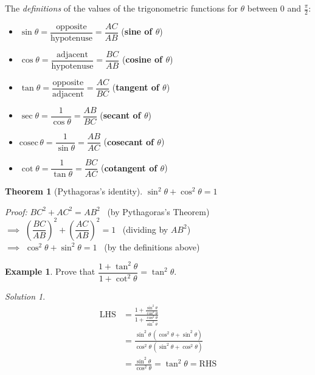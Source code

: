 \documentclass[
  12pt,
  oneside]{book}
\providecommand{\tightlist}{%
  \setlength{\itemsep}{0pt}\setlength{\parskip}{0pt}}
\newtheorem{theorem}{Theorem}[chapter]
\theoremstyle{definition}
\theoremstyle{definition}
\newtheorem{example}{Example}[chapter]
\theoremstyle{definition}
\theoremstyle{definition}
\theoremstyle{remark}
\newtheorem*{solution}{Solution}
\begin{document}
The \emph{definitions} of the values of the trigonometric functions for \(\theta\) between \(0\) and \(\frac{\pi}{2}\):

\begin{itemize}
\tightlist
\item
  \(\sin\theta = \dfrac{\text{opposite}}{\text{hypotenuse}} = \dfrac{AC}{AB}\) (\textbf{sine of \(\theta\)})
\item
  \(\cos\theta = \dfrac{\text{adjacent}}{\text{hypotenuse}} = \dfrac{BC}{AB}\) (\textbf{cosine of \(\theta\)})
\item
  \(\tan\theta = \dfrac{\text{opposite}}{\text{adjacent}} = \dfrac{AC}{BC}\) (\textbf{tangent of \(\theta\)})
\item
  \(\sec\theta = \dfrac{1}{\cos\theta} = \dfrac{AB}{BC}\) (\textbf{secant of \(\theta\)})
\item
  \(\mathrm{cosec}\,\theta = \dfrac{1}{\sin\theta} = \dfrac{AB}{AC}\) (\textbf{cosecant of \(\theta\)})
\item
  \(\cot\theta = \dfrac{1}{\tan\theta} = \dfrac{BC}{AC}\) (\textbf{cotangent of \(\theta\)})
\end{itemize}

\begin{theorem}[Pythagoras's identity]
\(\sin^2\theta+\cos^2\theta=1\)
\end{theorem}

\emph{Proof:} \(BC^2+AC^2=AB^2\) \hfill~{(by Pythagoras's Theorem)}\\
\(\implies\) \(\left(\dfrac{BC}{AB}\right)^2+\left(\dfrac{AC}{AB}\right)^2=1\) \hfill~{(dividing by \(AB^2\))}\\
\(\implies\) \(\cos^2\theta+\sin^2\theta = 1\) \hfill~{(by the definitions above)}

\begin{example}
Prove that \(\dfrac{1+\tan^2\theta}{1+\cot^2\theta} = \tan^2\theta\).
\end{example}

\begin{solution}
\begin{align*}
\mathrm{LHS} &= \frac{1+\frac{\sin^2\theta}{\cos^2\theta}}{1+\frac{\cos^2\theta}{\sin^2\theta}}\\
&= \frac{\sin^2\theta\,(\cos^2\theta+\sin^2\theta)}{\cos^2\theta\,(\sin^2\theta+\cos^2\theta)}\\
&=\frac{\sin^2\theta}{\cos^2\theta} = \tan^2\theta = \mathrm{RHS}
\end{align*}
\end{solution}
\end{document}
